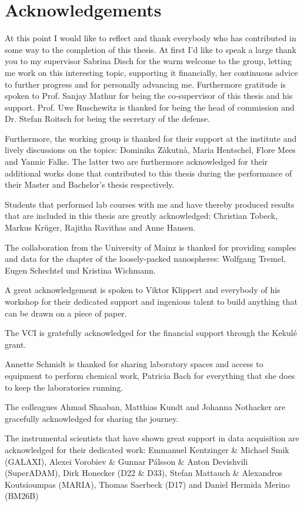 \documentclass[\main/dresen_thesis.tex]{subfiles}
\begin{document}
	\section*{Acknowledgements}
	At this point I would like to reflect and thank everybody who has contributed in some way to the completion of this thesis.
	At first I'd like to speak a large thank you to my supervisor Sabrina Disch for the warm welcome to the group, letting me work on this interesting topic, supporting it financially, her continuous advice to further progress and for personally advancing me.
	Furthermore gratitude is spoken to Prof. Sanjay Mathur for being the co-supervisor of this thesis and his support.
	Prof. Uwe Ruschewitz is thanked for being the head of commission and Dr. Stefan Roitsch for being the secretary of the defense.

	Furthermore, the working group is thanked for their support at the institute and lively discussions on the topics: Dominika Zàkutnà, Maria Hentschel, Flore Mees and Yannic Falke.
	The latter two are furthermore acknowledged for their additional works done that contributed to this thesis during the performance of their Master and Bachelor's thesis respectively.

	Students that performed lab courses with me and have thereby produced results that are included in this thesis are greatly acknowledged: Christian Tobeck, Markus Kr\"uger, Rajitha Ravithas and Anne Hansen.

	The collaboration from the University of Mainz is thanked for providing samples and data for the chapter of the loosely-packed nanospheres: Wolfgang Tremel, Eugen Schechtel und Kristina Wichmann.

	A great acknowledgement is spoken to Viktor Klippert and everybody of his workshop for their dedicated support and ingenious talent to build anything that can be drawn on a piece of paper.

	The VCI is gratefully acknowledged for the financial support through the Kekulé grant.

	Annette Schmidt is thanked for sharing laboratory spaces and access to equipment to perform chemical work, Patricia Bach for everything that she does to keep the laboratories running.

	The colleagues Ahmad Shaaban, Matthias Kundt and Johanna Nothacker are gracefully acknowledged for sharing the journey.

	The instrumental scientists that have shown great support in data acquisition are acknowledged for their dedicated work:
	Emmanuel Kentzinger \& Michael Smik (GALAXI), Alexei Vorobiev \& Gunnar Pálsson \& Anton Devishvili (SuperADAM), Dirk Honecker (D22 \& D33), Stefan Mattauch \& Alexandros Koutsioumpas (MARIA), Thomas Saerbeck (D17) and Daniel Hermida Merino (BM26B)
\end{document}
